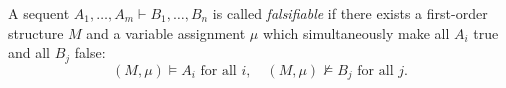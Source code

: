 

\setcounter{section}{2}
\setcounter{subsection}{2}
\setcounter{dfn}{3}

\begin{dfn}
A sequent $A_1, \ldots, A_m \vdash B_1, \ldots, B_n$ is called \emph{falsifiable}
if there exists a first-order structure $M$ and a variable assignment $\mu$ which simultaneously make all $A_i$ true and all $B_j$ false:
\[
(M,\mu) \vDash A_i \text{ for all }i, \quad (M,\mu) \not\vDash B_j \text{ for all }j.
\]
\end{dfn}


